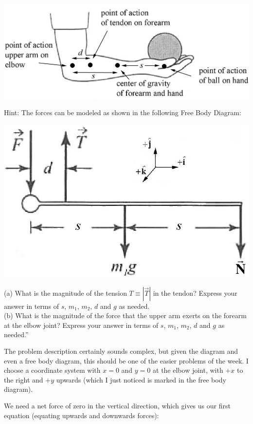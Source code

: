 \documentclass[8.01x]{subfiles}
\begin{document}
\begin{center}
\includegraphics[scale=1.0]{Graphics/h9p4_1}
\end{center}

Hint: The forces can be modeled as shown in the following Free Body Diagram:

\begin{center}
\includegraphics[scale=1.0]{Graphics/h9p4_2}
\end{center}

(a) What is the magnitude of the tension $T \equiv |\vec{T}|$ in the tendon? Express your answer in terms of $s$, $m_1$, $m_2$, $d$ and $g$ as needed.\\
(b) What is the magnitude of the force that the upper arm exerts on the forearm at the elbow joint? Express your answer in terms of $s$, $m_1$, $m_2$, $d$ and $g$ as needed.''

The problem description certainly sounds complex, but given the diagram and even a free body diagram, this should be one of the easier problems of the week. I choose a coordinate system with $x = 0$ and $y = 0$ at the elbow joint, with $+x$ to the right and $+y$ upwards (which I just noticed is marked in the free body diagram).

We need a net force of zero in the vertical direction, which gives us our first equation (equating upwards and downwards forces):
\end{document}
